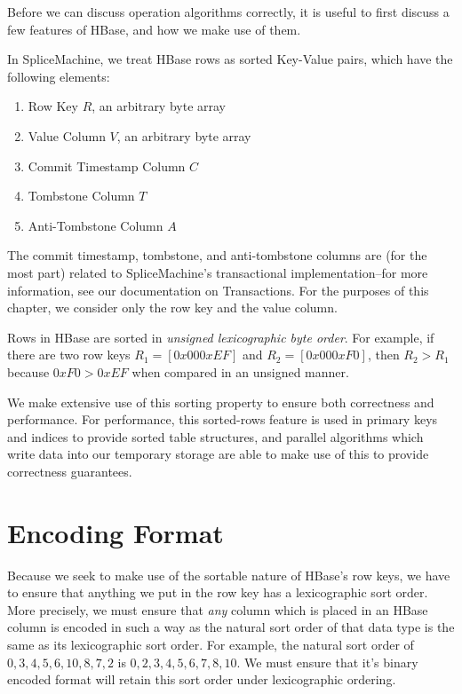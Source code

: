 \newcommand{\hex}[1]{\,\texttt{#1}\,}
\newcommand{\temp}{SPLICE\_TEMP }

Before we can discuss operation algorithms correctly, it is useful to first discuss a few features of HBase, and how we make use of them.

In SpliceMachine, we treat HBase rows as sorted Key-Value pairs, which have the following elements:
\begin{enumerate}
\item Row Key $R$, an arbitrary byte array
\item Value Column $V$, an arbitrary byte array
\item Commit Timestamp Column $C$
\item Tombstone Column $T$
\item Anti-Tombstone Column $A$
\end{enumerate}
The commit timestamp, tombstone, and anti-tombstone columns are (for the most part) related to SpliceMachine's transactional implementation--for more information, see our documentation on Transactions. For the purposes of this chapter, we consider only the row key and the value column.

Rows in HBase are sorted in \emph{unsigned lexicographic byte order}. For example, if there are two row keys $R_1 = [0x00 0xEF]$ and $R_2 = [0x00 0xF0]$, then $R_2 > R_1$ because $0xF0 > 0xEF$ when compared in an unsigned manner.

We make extensive use of this sorting property to ensure both correctness and performance. For performance, this sorted-rows feature is used in primary keys and indices to provide sorted table structures, and parallel algorithms which write data into our temporary storage are able to make use of this to provide correctness guarantees.

\section{Encoding Format}
Because we seek to make use of the sortable nature of HBase's row keys, we have to ensure that anything we put in the row key has a lexicographic sort order. More precisely, we must ensure that \emph{any} column which is placed in an HBase column is encoded in such a way as the natural sort order of that data type is the same as its lexicographic sort order. For example, the natural sort order of ${0,3,4,5,6,10,8,7,2}$ is $0,2,3,4,5,6,7,8,10$. We must ensure that it's binary encoded format will retain this sort order under lexicographic ordering.

